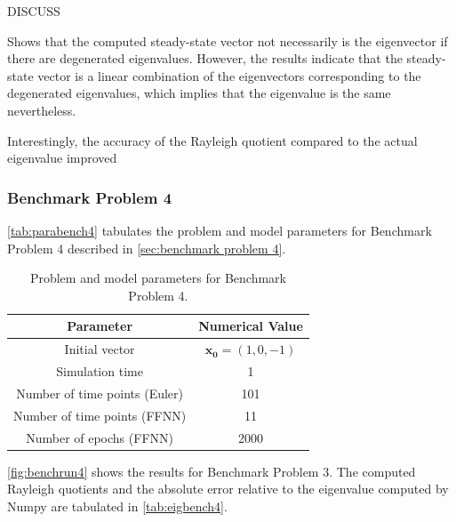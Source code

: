 DISCUSS

Shows that the computed steady-state vector not necessarily is the eigenvector if there are degenerated eigenvalues. However, the results indicate that the steady-state vector is a linear combination of the eigenvectors corresponding to the degenerated eigenvalues, which implies that the eigenvalue is the same nevertheless. 

Interestingly, the accuracy of the Rayleigh quotient compared to the actual eigenvalue improved 


\subsubsection{Benchmark Problem 4}

\autoref{tab:parabench4} tabulates the problem and model parameters for Benchmark Problem 4 described in \autoref{sec:benchmark problem 4}.

\begin{table}[H]
\caption{Problem and model parameters for Benchmark Problem 4.}
\centering
{}
\begin{tabular}{c|c}
\hline
\hline 
Parameter & Numerical Value
\\
\hline 
\hline 
Initial vector & $\bm{x_0}=(1, 0, -1)$
\\
Simulation time & 1
\\
Number of time points (Euler) & 101
\\
Number of time points (FFNN) & 11
\\
Number of epochs (FFNN) & 2000
\\
\hline
\hline 
\end{tabular}
\label{tab:parabench3}
\end{table}

\autoref{fig:benchrun4} shows the results for Benchmark Problem 3. The computed Rayleigh quotients and the absolute error relative to the eigenvalue computed by Numpy are tabulated in \autoref{tab:eigbench4}. 

